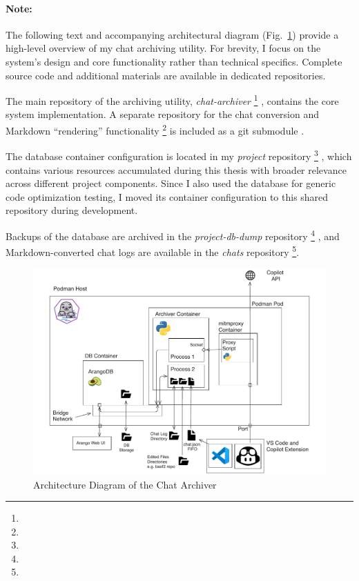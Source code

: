 \paragraph{Note:}
The following text and accompanying architectural diagram (Fig.\ \ref{fig:archiver-arch}) provide a high-level overview of my chat archiving utility.
For brevity, I focus on the system's design and core functionality rather than technical specifics.
Complete source code and additional materials are available in dedicated repositories.

The main repository of the archiving utility, \emph{chat-archiver}%
\footnote{}%
, contains the core system implementation. A separate repository for the chat conversion and Markdown \enquote{rendering} functionality%
\footnote{}
is included as a git submodule \cite{git-submodules}.

The database container configuration is located in my \emph{project} repository%
\footnote{}%
, which contains various resources accumulated during this thesis with broader relevance across different project components.
Since I also used the database for generic code optimization testing, I moved its container configuration to this shared repository during development.

Backups of the database are archived in the \emph{project-db-dump} repository%
\footnote{}%
, and Markdown-converted chat logs are available in the \emph{chats} repository%
\footnote{}.


\begin{figure}[h]
  \centering
  \includegraphics[width=\textwidth]{static/diagram.pdf}
  \caption{Architecture Diagram of the Chat Archiver\footnotemark}
  \label{fig:archiver-arch}
\end{figure}%


